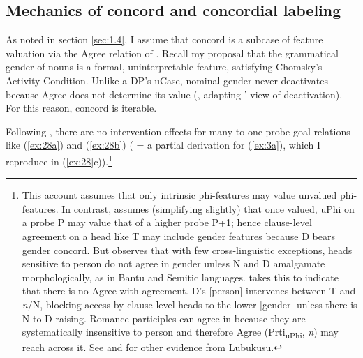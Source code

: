\documentclass[output=paper
,modfonts
,nonflat]{langsci/langscibook}
\begin{document}
\subsection{Mechanics of concord and concordial labeling} \label{sec:3.2}
As noted in section \ref{sec:1.4}, I assume that concord is a subcase of feature valuation via the Agree relation of \citealt{Chomsky2000, Chomsky2001}. Recall my proposal that the grammatical gender of nouns is a formal, uninterpretable feature, satisfying Chomsky's Activity Condition. Unlike a DP's uCase, nominal gender never deactivates because Agree does not determine its value (\citealt{Carstens2010, Carstens2011}, adapting \citealt{Nevins2005}' view of deactivation). For this reason, concord is iterable. 

Following \citet{Hiraiwa2001}, there are no intervention effects for many-to-one probe-goal relations like (\ref{ex:28a}) and (\ref{ex:28b}) ( = a partial derivation for (\ref{ex:3a}), which I reproduce in (\ref{ex:28}c)).\footnote{This account assumes that only intrinsic phi-features may value unvalued phi-features. In contrast, \citet{Danon2011} assumes (simplifying slightly) that once valued, uPhi on a probe P may value that of a higher probe P+1; hence clause-level agreement on a head like T may include gender features because D bears gender concord. But \citet{Carstens2011} observes that with few cross-linguistic exceptions, heads sensitive to person do not agree in gender unless N and D amalgamate morphologically, as in Bantu and Semitic languages. \citet{Carstens2011} takes this to indicate that there is no Agree-with-agreement. D’s [person] intervenes between T and \textit{n}/N, blocking access by clause-level heads to the lower [gender] unless there is N-to-D raising. Romance participles can agree in because they are systematically insensitive to person and therefore Agree (Prti\textsubscript{uPhi}, \textit{n}) may reach across it. See \citealt{Carstens_Diercks2013} and \citealt{Wasike2007} for other evidence from Lubukusu.} 
\end{document}
